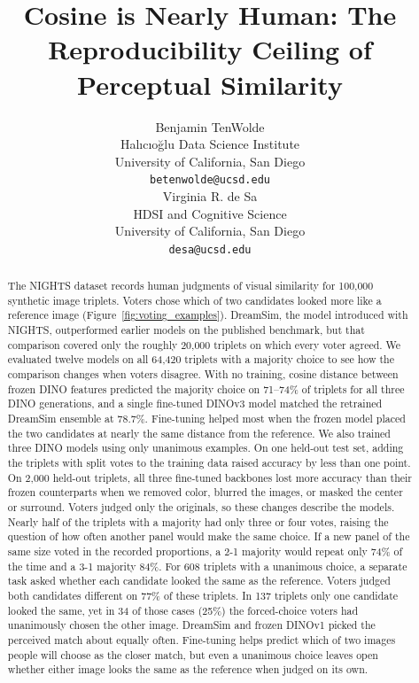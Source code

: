 \documentclass{article}
\title{Cosine is Nearly Human: The Reproducibility Ceiling of Perceptual Similarity}
\author{%
  Benjamin TenWolde \\
  Hal{\i}c{\i}o\u{g}lu Data Science Institute\\
  University of California, San Diego\\
  \texttt{betenwolde@ucsd.edu} \\
  \And
  Virginia R. de Sa \\
  HDSI and Cognitive Science\\
  University of California, San Diego\\
  \texttt{desa@ucsd.edu}
}
\begin{document}
\maketitle

\begin{abstract}
The NIGHTS dataset records human judgments of visual similarity for 100{,}000 synthetic image triplets. Voters chose which of two candidates looked more like a reference image (Figure~\ref{fig:voting_examples}). DreamSim, the model introduced with NIGHTS, outperformed earlier models on the published benchmark, but that comparison covered only the roughly 20{,}000 triplets on which every voter agreed. We evaluated twelve models on all 64{,}420 triplets with a majority choice to see how the comparison changes when voters disagree. With no training, cosine distance between frozen DINO features predicted the majority choice on 71--74\% of triplets for all three DINO generations, and a single fine-tuned DINOv3 model matched the retrained DreamSim ensemble at 78.7\%. Fine-tuning helped most when the frozen model placed the two candidates at nearly the same distance from the reference. We also trained three DINO models using only unanimous examples. On one held-out test set, adding the triplets with split votes to the training data raised accuracy by less than one point. On 2{,}000 held-out triplets, all three fine-tuned backbones lost more accuracy than their frozen counterparts when we removed color, blurred the images, or masked the center or surround. Voters judged only the originals, so these changes describe the models. Nearly half of the triplets with a majority had only three or four votes, raising the question of how often another panel would make the same choice. If a new panel of the same size voted in the recorded proportions, a 2-1 majority would repeat only 74\% of the time and a 3-1 majority 84\%. For 608 triplets with a unanimous choice, a separate task asked whether each candidate looked the same as the reference. Voters judged both candidates different on 77\% of these triplets. In 137 triplets only one candidate looked the same, yet in 34 of those cases (25\%) the forced-choice voters had unanimously chosen the other image. DreamSim and frozen DINOv1 picked the perceived match about equally often. Fine-tuning helps predict which of two images people will choose as the closer match, but even a unanimous choice leaves open whether either image looks the same as the reference when judged on its own.
\end{abstract}
\end{document}
